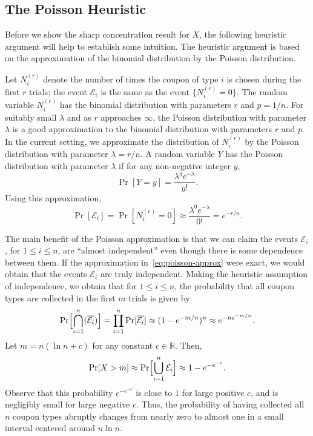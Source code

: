 \documentclass[twoside,12pt]{book}
\theoremstyle{plain}
\theoremstyle{definition}
\theoremstyle{remark}
\begin{document}
\subsection{The Poisson Heuristic}

Before we show the sharp concentration result for $X$, the following heuristic argument will help to establish some intuition. The heuristic argument is based on the approximation of the binomial distribution by the Poisson distribution.

Let $N_i^{(r)}$ denote the number of times the coupon of type $i$ is chosen during the first $r$ trials; the event $\mathcal{E}_i$ is the same as the event $\{N_i^{(r)} = 0\}$. The random variable $N_i^{(r)}$ has the binomial distribution with parameters $r$ and $p = 1/n$. For suitably small $\lambda$ and as $r$ approaches $\infty$, the Poisson distribution with parameter $\lambda$ is a good approximation to the binomial distribution with parameters $r$ and $p$. In the current setting, we approximate the distribution of $N_i^{(r)}$ by the Poisson distribution with parameter $\lambda = r/n$. A random variable $Y$ has the Poisson distribution with parameter $\lambda$ if for any non-negative integer $y$,
\[
\Pr[Y = y] = \frac{\lambda^y e^{-\lambda}}{y!}.
\]
Using this approximation,
\begin{equation}
\Pr[\mathcal{E}_i] = \Pr[N_i^{(r)} = 0] \approx \frac{\lambda^0 e^{-\lambda}}{0!} = e^{-r/n}.
\label{eq:poisson-approx}
\end{equation}

The main benefit of the Poisson approximation is that we can claim the events $\mathcal{E}_i$, for $1 \leq i \leq n$, are ``almost independent'' even though there is some dependence between them. If the approximation in~\eqref{eq:poisson-approx} were exact, we would obtain that the events $\mathcal{E}_i$ are truly independent. Making the heuristic assumption of independence, we obtain that for $1 \leq i \leq n$, the probability that all coupon types are collected in the first $m$ trials is given by
\[
\Pr\Bigl[\bigcap_{i=1}^{n} (\overline{\mathcal{E}_i})\Bigr] = \prod_{i=1}^{n} \Pr[\overline{\mathcal{E}_i}] \approx (1 - e^{-m/n})^n \approx e^{-n e^{-m/n}}.
\]
Let $m = n(\ln n + c)$ for any constant $c \in \mathbb{R}$. Then,
\[
\Pr[X > m] \approx \Pr\Bigl[\bigcup_{i=1}^{n} \mathcal{E}_i\Bigr] \approx 1 - e^{-e^{-c}}.
\]
Observe that this probability $e^{-e^{-c}}$ is close to $1$ for large positive $c$, and is negligibly small for large negative $c$. Thus, the probability of having collected all $n$ coupon types abruptly changes from nearly zero to almost one in a small interval centered around $n \ln n$.
\end{document}
